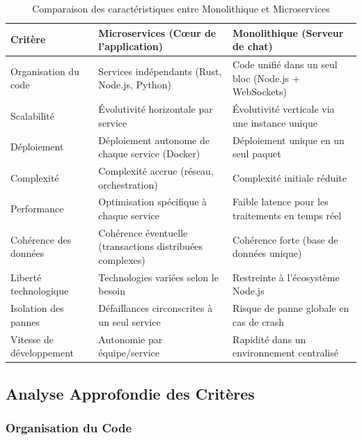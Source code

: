 \documentclass[12pt]{rapportPfe}
\begin{document}
\begin{table}[H]
\centering
\begin{tabular}{|p{4cm}|p{5.5cm}|p{5.5cm}|}
\hline
\textbf{Critère} & \textbf{Microservices (Cœur de l'application)} & \textbf{Monolithique (Serveur de chat)} \\
\hline
Organisation du code & Services indépendants (Rust, Node.js, Python) & Code unifié dans un seul bloc (Node.js + WebSockets) \\
\hline
Scalabilité & Évolutivité horizontale par service & Évolutivité verticale via une instance unique \\
\hline
Déploiement & Déploiement autonome de chaque service (Docker) & Déploiement unique en un seul paquet \\
\hline
Complexité & Complexité accrue (réseau, orchestration) & Complexité initiale réduite \\
\hline
Performance & Optimisation spécifique à chaque service & Faible latence pour les traitements en temps réel \\
\hline
Cohérence des données & Cohérence éventuelle (transactions distribuées complexes) & Cohérence forte (base de données unique) \\
\hline
Liberté technologique & Technologies variées selon le besoin & Restreinte à l’écosystème Node.js \\
\hline
Isolation des pannes & Défaillances circonscrites à un seul service & Risque de panne globale en cas de crash \\
\hline
Vitesse de développement & Autonomie par équipe/service & Rapidité dans un environnement centralisé \\
\hline
\end{tabular}
\caption{Comparaison des caractéristiques entre Monolithique et Microservices}
\label{tab:Arch-comp}
\end{table}

\subsection{Analyse Approfondie des Critères}

\subsubsection{Organisation du Code}
\end{document}
